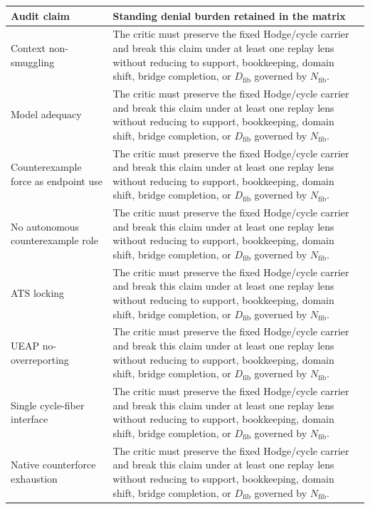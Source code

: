 \documentclass[11pt]{article}
\begin{document}
{\scriptsize
\begin{longtable}{p{}p{}}
\toprule
Audit claim & Standing denial burden retained in the matrix\\
\midrule
\endhead
Context non-smuggling & The critic must preserve the fixed Hodge/cycle carrier and break this claim under at least one replay lens without reducing to support, bookkeeping, domain shift, bridge completion, or $D_{\mathrm{fib}}$ governed by $N_{\mathrm{fib}}$.\\
Model adequacy & The critic must preserve the fixed Hodge/cycle carrier and break this claim under at least one replay lens without reducing to support, bookkeeping, domain shift, bridge completion, or $D_{\mathrm{fib}}$ governed by $N_{\mathrm{fib}}$.\\
Counterexample force as endpoint use & The critic must preserve the fixed Hodge/cycle carrier and break this claim under at least one replay lens without reducing to support, bookkeeping, domain shift, bridge completion, or $D_{\mathrm{fib}}$ governed by $N_{\mathrm{fib}}$.\\
No autonomous counterexample role & The critic must preserve the fixed Hodge/cycle carrier and break this claim under at least one replay lens without reducing to support, bookkeeping, domain shift, bridge completion, or $D_{\mathrm{fib}}$ governed by $N_{\mathrm{fib}}$.\\
ATS locking & The critic must preserve the fixed Hodge/cycle carrier and break this claim under at least one replay lens without reducing to support, bookkeeping, domain shift, bridge completion, or $D_{\mathrm{fib}}$ governed by $N_{\mathrm{fib}}$.\\
UEAP no-overreporting & The critic must preserve the fixed Hodge/cycle carrier and break this claim under at least one replay lens without reducing to support, bookkeeping, domain shift, bridge completion, or $D_{\mathrm{fib}}$ governed by $N_{\mathrm{fib}}$.\\
Single cycle-fiber interface & The critic must preserve the fixed Hodge/cycle carrier and break this claim under at least one replay lens without reducing to support, bookkeeping, domain shift, bridge completion, or $D_{\mathrm{fib}}$ governed by $N_{\mathrm{fib}}$.\\
Native counterforce exhaustion & The critic must preserve the fixed Hodge/cycle carrier and break this claim under at least one replay lens without reducing to support, bookkeeping, domain shift, bridge completion, or $D_{\mathrm{fib}}$ governed by $N_{\mathrm{fib}}$.\\

\end{longtable}}
\end{document}
